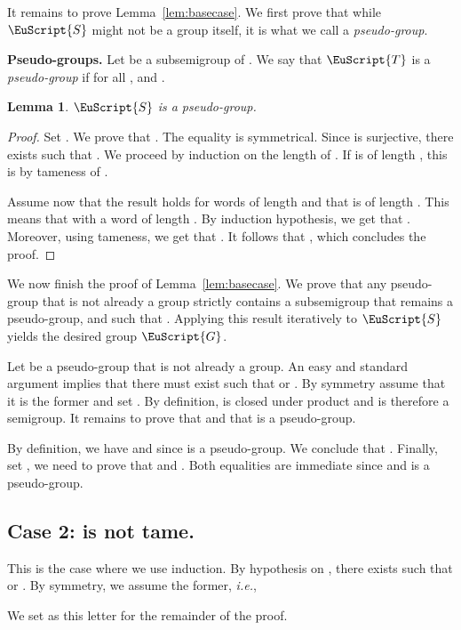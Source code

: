 \documentclass{CSML}
\newcommand\Ss{\ensuremath{\EuScript{S}}\xspace}
\newcommand\Gs{\ensuremath{\EuScript{G}}\xspace}
\newcommand\Ts{\ensuremath{\EuScript{T}}\xspace}
\theoremstyle{plain}
\newtheorem{lemma}[thm]{Lemma}
\begin{document}
It remains to prove Lemma~\ref{lem:basecase}. We first prove that
while \Ss might not be a group itself, it is what we call a
\emph{pseudo-group}.

\medskip
\noindent
{\bf Pseudo-groups.} Let  be a subsemigroup of . We say
that \Ts is a \emph{pseudo-group} if for all ,
 and .

\begin{lemma} \label{lem:basecase2}
\Ss is a pseudo-group.
\end{lemma}

\begin{proof}
Set . We prove that . The
equality    is
symmetrical. Since  is surjective, there exists  such
that . We proceed by induction on the length of . If
 is of length , this is by tameness of .

Assume now that the result holds for words of length  and that 
is of length . This means that  with  a word of length
. By induction hypothesis, we get that . Moreover, using tameness, we get that . It follows that , which concludes the proof.
\end{proof}

We now finish the proof of Lemma~\ref{lem:basecase}. We prove that
any pseudo-group  that is not already a group
strictly contains a subsemigroup  that remains a pseudo-group, and
such that .  Applying this result iteratively
to \Ss yields the desired group \Gs.

\smallskip
Let  be a pseudo-group that is not already a
group. An easy and standard argument implies that there
must exist  such that  or . By symmetry assume that it is the former and
set . By definition,  is closed under product
and is therefore a semigroup. It remains to prove that  and that  is a
pseudo-group.

By definition, we have  and  since  is
a pseudo-group. We conclude that . Finally, set , we need to prove that
 and . Both equalities are immediate since
 and  is a pseudo-group.

\subsection{\texorpdfstring{Case 2:  is not tame.}{Case 2: beta
    is not tame.}} This is the case where we use induction. By
hypothesis on , there exists  such that  or . By symmetry, we assume the former, \emph{i.e.},

We set  as this
letter for the remainder of the proof.
\end{document}
